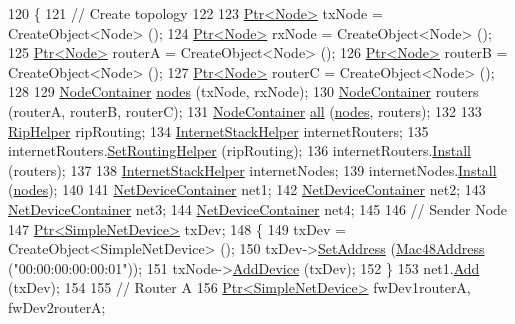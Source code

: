 \begin{DoxyCode}
120 \{
121   \textcolor{comment}{// Create topology}
122 
123   \hyperlink{classns3_1_1Ptr}{Ptr<Node>} txNode = CreateObject<Node> ();
124   \hyperlink{classns3_1_1Ptr}{Ptr<Node>} rxNode = CreateObject<Node> ();
125   \hyperlink{classns3_1_1Ptr}{Ptr<Node>} routerA = CreateObject<Node> ();
126   \hyperlink{classns3_1_1Ptr}{Ptr<Node>} routerB = CreateObject<Node> ();
127   \hyperlink{classns3_1_1Ptr}{Ptr<Node>} routerC = CreateObject<Node> ();
128 
129   \hyperlink{classns3_1_1NodeContainer}{NodeContainer} \hyperlink{visualizer-ideas_8txt_a3e1b3808014a2c68ab0cd0182e041be2}{nodes} (txNode, rxNode);
130   \hyperlink{classns3_1_1NodeContainer}{NodeContainer} routers (routerA, routerB, routerC);
131   \hyperlink{classns3_1_1NodeContainer}{NodeContainer} \hyperlink{buildings__pathloss_8m_a00a349297fa58bc80ff5329e25dcfe28}{all} (\hyperlink{visualizer-ideas_8txt_a3e1b3808014a2c68ab0cd0182e041be2}{nodes}, routers);
132 
133   \hyperlink{classns3_1_1RipHelper}{RipHelper} ripRouting;
134   \hyperlink{classns3_1_1InternetStackHelper}{InternetStackHelper} internetRouters;
135   internetRouters.\hyperlink{classns3_1_1InternetStackHelper_a3e382c02df022dec79952a7eca8cd5ba}{SetRoutingHelper} (ripRouting);
136   internetRouters.\hyperlink{classns3_1_1InternetStackHelper_a6645b412f31283d2d9bc3d8a95cebbc0}{Install} (routers);
137 
138   \hyperlink{classns3_1_1InternetStackHelper}{InternetStackHelper} internetNodes;
139   internetNodes.\hyperlink{classns3_1_1InternetStackHelper_a6645b412f31283d2d9bc3d8a95cebbc0}{Install} (\hyperlink{visualizer-ideas_8txt_a3e1b3808014a2c68ab0cd0182e041be2}{nodes});
140 
141   \hyperlink{classns3_1_1NetDeviceContainer}{NetDeviceContainer} net1;
142   \hyperlink{classns3_1_1NetDeviceContainer}{NetDeviceContainer} net2;
143   \hyperlink{classns3_1_1NetDeviceContainer}{NetDeviceContainer} net3;
144   \hyperlink{classns3_1_1NetDeviceContainer}{NetDeviceContainer} net4;
145 
146   \textcolor{comment}{// Sender Node}
147   \hyperlink{classns3_1_1Ptr}{Ptr<SimpleNetDevice>} txDev;
148   \{
149     txDev = CreateObject<SimpleNetDevice> ();
150     txDev->\hyperlink{classns3_1_1SimpleNetDevice_a968ef3e7318bac29d5f1d7d977029af4}{SetAddress} (\hyperlink{classns3_1_1Mac48Address}{Mac48Address} (\textcolor{stringliteral}{"00:00:00:00:00:01"}));
151     txNode->\hyperlink{classns3_1_1Node_a42ff83ee1d5d1649c770d3f5b62375de}{AddDevice} (txDev);
152   \}
153   net1.\hyperlink{classns3_1_1NetDeviceContainer_a7ca8bc1d7ec00fd4fcc63869987fbda5}{Add} (txDev);
154 
155   \textcolor{comment}{// Router A}
156   \hyperlink{classns3_1_1Ptr}{Ptr<SimpleNetDevice>} fwDev1routerA, fwDev2routerA;

\end{DoxyCode}
